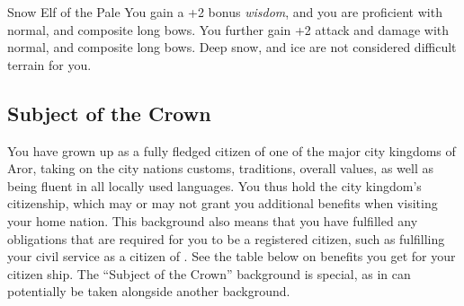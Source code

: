 \begin{35e}{Snow Elf of the Pale}
  You gain a +2 bonus \emph{wisdom}, and you are proficient with normal, and
  composite long bows. You further gain +2 attack and damage with normal, and
  composite long bows. Deep snow, and ice are not considered difficult terrain
  for you.
\end{35e}

\subsection{Subject of the Crown}
\label{sec:background:Subject of the Crown}

You have grown up as a fully fledged citizen of one of the major city kingdoms
of Aror, taking on the city nations customs, traditions, overall values, as
well as being fluent in all locally used languages. You thus hold the city
kingdom's citizenship, which may or may not grant you additional benefits when
visiting your home nation. This background also means that you have fulfilled
any obligations that are required for you to be a registered citizen, such as
fulfilling your civil service as a citizen of . See the
table below on benefits you get for your citizen ship. The ``Subject of the
Crown'' background is special, as in can potentially be taken alongside another
background.

